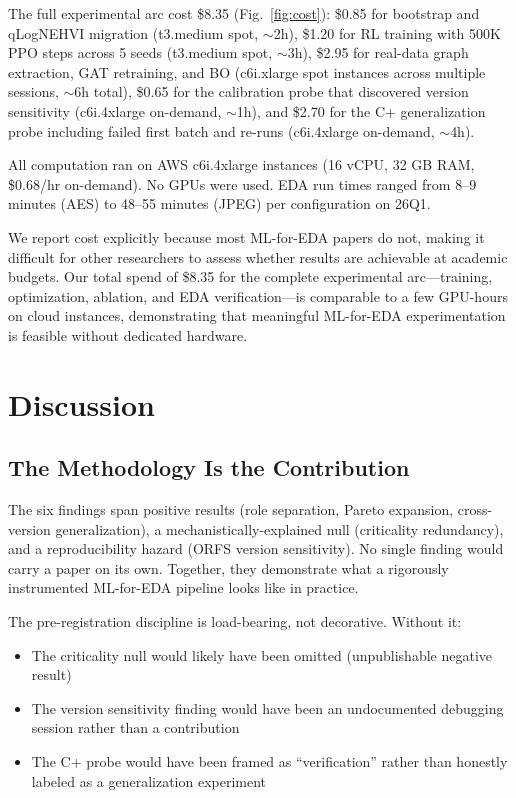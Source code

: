 \documentclass[conference]{IEEEtran}
\begin{document}
The full experimental arc cost \$8.35 (Fig.~\ref{fig:cost}): \$0.85 for
bootstrap and qLogNEHVI migration (t3.medium spot, $\sim$2h), \$1.20 for
RL training with 500K PPO steps across 5 seeds (t3.medium spot, $\sim$3h),
\$2.95 for real-data graph extraction, GAT retraining, and BO
(c6i.xlarge spot instances across multiple sessions, $\sim$6h total),
\$0.65 for the calibration probe that discovered version sensitivity
(c6i.4xlarge on-demand, $\sim$1h), and \$2.70 for the C+ generalization
probe including failed first batch and re-runs (c6i.4xlarge on-demand,
$\sim$4h).

All computation ran on AWS c6i.4xlarge instances (16 vCPU, 32 GB RAM,
\$0.68/hr on-demand). No GPUs were used. EDA run times ranged from 8--9
minutes (AES) to 48--55 minutes (JPEG) per configuration on 26Q1.

We report cost explicitly because most ML-for-EDA papers do not, making
it difficult for other researchers to assess whether results are achievable
at academic budgets. Our total spend of \$8.35 for the complete experimental
arc—training, optimization, ablation, and EDA verification—is comparable to
a few GPU-hours on cloud instances, demonstrating that meaningful ML-for-EDA
experimentation is feasible without dedicated hardware.

\section{Discussion}

\subsection{The Methodology Is the Contribution}

The six findings span positive results (role separation, Pareto expansion,
cross-version generalization), a mechanistically-explained null (criticality
redundancy), and a reproducibility hazard (ORFS version sensitivity). No
single finding would carry a paper on its own. Together, they demonstrate
what a rigorously instrumented ML-for-EDA pipeline looks like in practice.

The pre-registration discipline is load-bearing, not decorative. Without it:
\begin{itemize}
\item The criticality null would likely have been omitted (unpublishable
negative result)
\item The version sensitivity finding would have been an undocumented
debugging session rather than a contribution
\item The C+ probe would have been framed as ``verification'' rather than
honestly labeled as a generalization experiment
\end{itemize}
\end{document}
